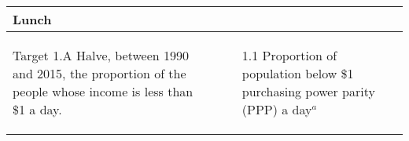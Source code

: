 \documentclass[10pt]{article}
\begin{document}
\begin{center}
\begin{tabularx}{\textwidth}[t]{XX}
\arrayrulecolor{green}\hline
\textbf{\textcolor{myGreen}{Lunch}} & \\
\hline
Target 1.A Halve, between 1990 and 2015, the proportion of the people whose income is less than \$1 a day. & 
\begin{minipage}[t]{\linewidth}%
\begin{itemize}
\item[1.1] Proportion of population below \$1 purchasing power parity (PPP) a day$^a$
\end{itemize} 
\end{minipage}\\

\hline
\end{tabularx}
\end{center}


%
%
%
%
%
%
\end{document}
